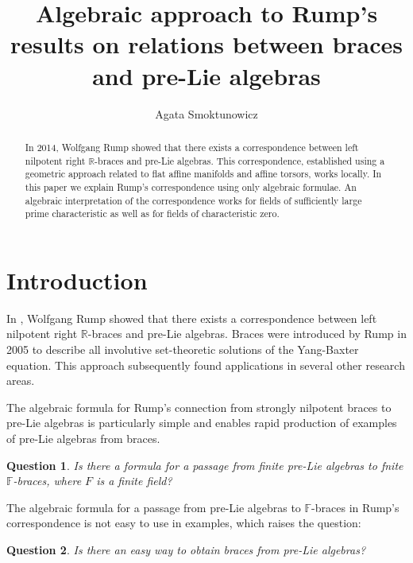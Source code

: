 \documentclass[12pt]{article}
\newtheorem{question}{Question}
\begin{document}
\def\F{{\mathbb F}}
\title{ Algebraic approach to Rump's results on relations between  braces and pre-Lie algebras }

\author{Agata Smoktunowicz}
\date{}
\maketitle
\begin{abstract}



In 2014, Wolfgang  Rump showed that there exists a correspondence  between left nilpotent right $\mathbb R$-braces and pre-Lie algebras.
This correspondence, established  using a geometric approach related to flat affine manifolds and affine torsors, works locally. In this paper we explain  Rump's correspondence using only algebraic formulae. 
An algebraic interpretation  of the  correspondence works for fields of sufficiently large prime characteristic as well as for fields of characteristic zero. 

\end{abstract}

\section{Introduction}

In \cite{Rump}, Wolfgang Rump showed that there exists a correspondence  between left nilpotent right $\mathbb R$-braces and pre-Lie algebras.   Braces were introduced by Rump in 2005 to describe all involutive set-theoretic solutions of the Yang-Baxter equation. This approach subsequently found applications in several other research areas. 

  The  algebraic formula for Rump's  connection from strongly nilpotent braces to pre-Lie algebras is particularly simple and enables  rapid production of  examples of pre-Lie algebras from braces.

\begin{question}
 Is there a formula for a  passage from finite pre-Lie algebras to fnite $\mathbb F$-braces, where $F$ is a finite field?
\end{question}

 The algebraic formula for a passage from pre-Lie algebras to $\mathbb F$-braces in Rump's correspondence is not easy to use in examples, which raises the question:
\begin{question}
 Is there an easy  way  to obtain braces from pre-Lie algebras?
\end{question}
\end{document}
